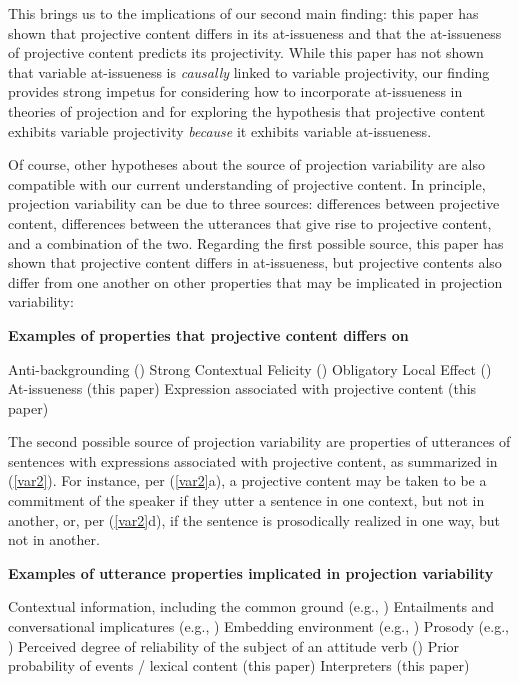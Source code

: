 \documentclass[11pt,fleqn]{article}
\newcommand{\6}{\mbox{$[\hspace*{-.6mm}[$}}
\newcommand{\9}{\mbox{$]\hspace*{-.6mm}]$}}
\begin{document}
This brings us to the implications of our second main finding: this paper has shown that projective content differs in its at-issueness and that the at-issueness of projective content predicts its projectivity. While this paper has not shown that variable at-issueness is {\em causally} linked to variable projectivity, our finding provides strong impetus for considering how to incorporate at-issueness in theories of projection and for exploring the hypothesis that projective content exhibits variable projectivity {\em because} it exhibits variable at-issueness. 

Of course, other hypotheses about the source of projection variability are also compatible with our current understanding of projective content. In principle, projection variability can be due to three sources: differences between projective content, differences between the utterances that give rise to projective content, and a combination of the two. Regarding the first possible source, this paper has shown that projective content differs in at-issueness, but projective contents also differ from one another on other properties that may be implicated in projection variability:

\begin{exe}
\ex\label{var1} {\bf Examples of properties that projective content differs on}
\begin{xlist}
\ex Anti-backgrounding (\citealt{potts05}) 
\ex Strong Contextual Felicity (\citealt{brst-lang11}) 
\ex Obligatory Local Effect (\citealt{brst-lang11}) 
\ex At-issueness (this paper) 
\ex Expression associated with projective content (this paper) 
\end{xlist}
\end{exe}

The second possible source of projection variability are properties of utterances of sentences with expressions associated with projective content, as summarized in (\ref{var2}). For instance, per (\ref{var2}a), a projective content may be taken to be a commitment of the speaker if they utter a sentence in one context, but not in another, or, per (\ref{var2}d), if the sentence is prosodically realized in one way, but not in another. 

\begin{exe}
\ex\label{var2} {\bf Examples of utterance properties implicated in projection variability}
\begin{xlist}
\ex Contextual information, including the common ground (e.g., \citealt{gazdar79a,gazdar79b})
\ex Entailments and conversational implicatures (e.g., \citealt{gazdar79a,gazdar79b})
\ex Embedding environment (e.g., \citealt{smith-hall-cls})
\ex Prosody (e.g., \citealt{abrusan2011,cummins-rohde2015,tonhauser-salt26,stevens-etal2017}) 
\ex Perceived degree of reliability of the subject of an attitude verb (\citealt{schlenker10})
\ex Prior probability of events / lexical content (this paper)
\ex Interpreters (this paper)
\end{xlist}
\end{exe}
\end{document}
